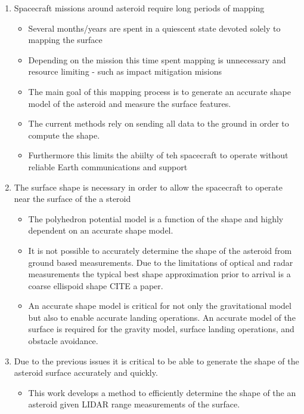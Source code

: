 \documentclass[letterpaper, paper,11pt]{AAS}		%
\begin{document}
\begin{enumerate}
    \item Spacecraft missions around asteroid require long periods of mapping
        \begin{itemize}
            \item Several months/years are spent in a quiescent state devoted solely to mapping the surface
            \item Depending on the mission this time spent mapping is unnecessary and resource limiting - such as impact mitigation misions
            \item The main goal of this mapping process is to generate an accurate shape model of the asteroid and measure the surface features.
            \item The current methods rely on sending all data to the ground in order to compute the shape. 
            \item Furthermore this limits the abiilty  of teh spacecraft to operate without  reliable Earth communications and support
        \end{itemize}
    \item The surface shape is necessary in order to allow the spacecraft to operate near the surface of the a steroid
        \begin{itemize}
            \item The polyhedron potential model is a function of the shape and highly dependent on an accurate shape model.
            \item It is not possible to accurately determine the shape of the asteroid from ground based measurements.
                Due to the limitations of optical and radar measurements the typical best shape approximation prior to arrival is a coarse ellispoid shape CITE a paper.
            \item An accurate shape model is critical for not only the gravitational model but also to enable accurate landing operations.
                An accurate model of the surface is required for the gravity model, surface landing operations, and obstacle avoidance.
        \end{itemize}
    \item Due to the previous issues it is critical to be able to generate the shape of the asteroid surface accurately and quickly.
        \begin{itemize}
            \item This work develops a method to efficiently determine the shape of the an asteroid given LIDAR range measurements of the surface.

\end{itemize}
\end{enumerate}
\end{document}
